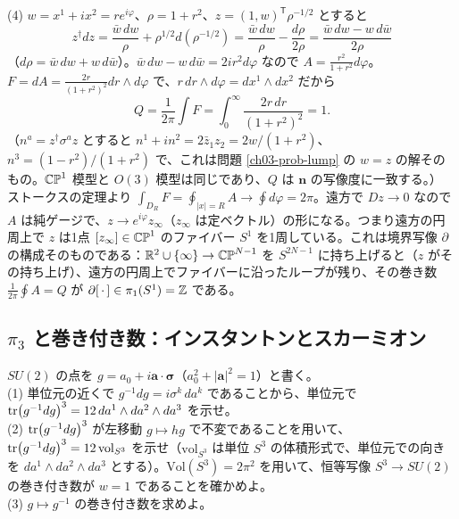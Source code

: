 \begin{solution}
(4) $w=x^1+ix^2=re^{i\varphi}$、$\rho=1+r^2$、$z=(1,w)^{\mathsf T}\rho^{-1/2}$ とすると
\[
z^\dagger dz=\frac{\bar w\,dw}{\rho}+\rho^{1/2}d(\rho^{-1/2})=\frac{\bar w\,dw}{\rho}-\frac{d\rho}{2\rho}=\frac{\bar w\,dw-w\,d\bar w}{2\rho}
\]
（$d\rho=\bar w\,dw+w\,d\bar w$）。$\bar w\,dw-w\,d\bar w=2ir^2d\varphi$ なので $A=\frac{r^2}{1+r^2}d\varphi$。$F=dA=\frac{2r}{(1+r^2)^2}dr\wedge d\varphi$ で、$r\,dr\wedge d\varphi=dx^1\wedge dx^2$ だから
\[
Q=\frac{1}{2\pi}\int F=\int_0^\infty\frac{2r\,dr}{(1+r^2)^2}=1 .
\]
（$n^a=z^\dagger\sigma^az$ とすると $n^1+in^2=2\bar z_1z_2=2w/(1+r^2)$、$n^3=(1-r^2)/(1+r^2)$ で、これは問題 \ref{ch03-prob-lump} の $w=z$ の解そのもの。$\mathbb{CP}^1$ 模型と $O(3)$ 模型は同じであり、$Q$ は $\bm n$ の写像度に一致する。）\\
ストークスの定理より $\int_{D_R}F=\oint_{\lvert x\rvert=R}A\to\oint d\varphi=2\pi$。遠方で $Dz\to0$ なので $A$ は純ゲージで、$z\to e^{i\varphi}z_\infty$（$z_\infty$ は定ベクトル）の形になる。つまり遠方の円周上で $z$ は1点 $[z_\infty]\in\mathbb{CP}^1$ のファイバー $S^1$ を1周している。これは境界写像 $\partial$ の構成そのものである：$\mathbb{R}^2\cup\{\infty\}\to\mathbb{CP}^{N-1}$ を $S^{2N-1}$ に持ち上げると（$z$ がその持ち上げ）、遠方の円周上でファイバーに沿ったループが残り、その巻き数 $\frac1{2\pi}\oint A=Q$ が $\partial[\,\cdot\,]\in\pi_1(S^1)=\mathbb{Z}$ である。
\end{solution}

\subsection{$\pi_3$ と巻き付き数：インスタントンとスカーミオン}

\begin{problem}[難易度 A]\label{ch03-prob-wid}
$SU(2)$ の点を $g=a_0+i\bm a\cdot\bm\sigma$（$a_0^2+\lvert\bm a\rvert^2=1$）と書く。\\
(1) 単位元の近くで $g^{-1}dg=i\sigma^k\,da^k$ であることから、単位元で $\tr(g^{-1}dg)^3=12\,da^1\wedge da^2\wedge da^3$ を示せ。\\
(2) $\tr(g^{-1}dg)^3$ が左移動 $g\mapsto hg$ で不変であることを用いて、$\tr(g^{-1}dg)^3=12\,\mathrm{vol}_{S^3}$ を示せ（$\mathrm{vol}_{S^3}$ は単位 $S^3$ の体積形式で、単位元での向きを $da^1\wedge da^2\wedge da^3$ とする）。$\mathrm{Vol}(S^3)=2\pi^2$ を用いて、恒等写像 $S^3\to SU(2)$ の巻き付き数が $w=1$ であることを確かめよ。\\
(3) $g\mapsto g^{-1}$ の巻き付き数を求めよ。
\end{problem}

